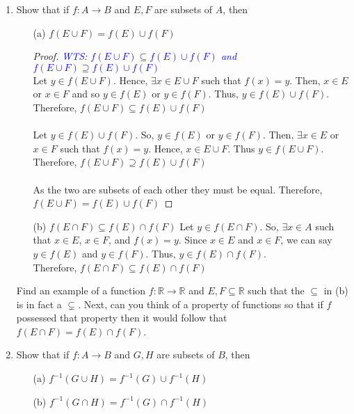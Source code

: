 \documentclass[12pt]{article}
\newcommand{\wts}[1]{\textit{\textcolor{blue}{WTS: #1}}\\}
\begin{document}
\begin{enumerate}
\newpage
    
    \item Show that if $f:A \to B$ and $E, F$ are subsets of $A$, then
    \begin{itemize}
        \item[(a)] $f(E \cup F) = f(E) \cup f(F)$
        \begin{proof}
        	\wts{$ f(E \cup F) \subseteq f(E) \cup f(F) $ and $ f(E \cup F) \supseteq f(E) \cup f(F)$ }
        	Let $ y\in f(E\cup F) $. Hence, $ \exists x\in E \cup F$ such that $ f(x)=y $. Then, $ x\in E$ or $ x\in F $ and so $ y\in f(E) $ or $ y\in f(F) $. Thus, $ y\in f(E)\cup f(F) $. Therefore, $ f(E \cup F) \subseteq f(E) \cup f(F) $ \\
        	\\
        	Let $ y\in f(E)\cup f(F) $. So, $ y\in f(E) $ or $ y\in f(F) $. Then, $ \exists x\in E $ or $ x\in F $ such that $ f(x)=y $. Hence, $ x\in E\cup F.$ Thus $ y\in f(E\cup F) $. Therefore, $ f(E \cup F) \supseteq f(E) \cup f(F)$\\
        	\\
        	As the two are subsets of each other they must be equal. Therefore, $f(E \cup F) = f(E) \cup f(F)$
        \end{proof}
        \item[(b)] $f(E \cap F) \subseteq f(E) \cap f(F)$
        Let $ y \in f(E\cap F) $. So, $\exists x\in A$ such that $ x\in E $, $ x\in F $, and $ f(x)=y $. Since $ x\in E $ and $ x\in F $, we can say $ y\in f(E) $ and $ y\in f(F) $. Thus, $ y\in f(E)\cap f(F) $.\\
        Therefore, $f(E \cap F) \subseteq f(E) \cap f(F)$
    \end{itemize}    
    Find an example of a function $f: \mathbb{R} \to \mathbb{R}$ and $E, F \subseteq \mathbb{R}$ such that the $\subseteq$ in (b) is in fact a $\subsetneq$. Next, can you think of a property of functions so that if $f$ possessed that property then it would follow that $f(E \cap F) = f(E) \cap f(F)$.

    \item Show that if $f:A \to B$ and $G, H$ are subsets of $B$, then
    \begin{itemize}
        \item[(a)] $f^{-1}(G \cup H) = f^{-1}(G) \cup f^{-1}(H)$
        \item[(b)] $f^{-1}(G \cap H) = f^{-1}(G) \cap f^{-1}(H)$
    \end{itemize}  


\end{enumerate}
\end{document}
